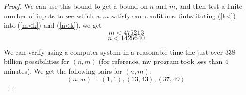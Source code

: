 \documentclass{article}
\begin{document}
\begin{proof}
	We can use this bound to get a bound on $n$ and $m$,
	and then test a finite number of inputs to see which $n,m$ satisfy our conditions.
	Substituting (\ref{k<}) into (\ref{m<k}) and (\ref{n<k}), we get
	\begin{equation}
		m < 475213
	\end{equation}
	\begin{equation}
		n < 1425640
	\end{equation}
	
	We can verify using a computer system in a reasonable time
	the just over $338$ billion possibilities for $(n,m)$
	(for reference, my program took less than $4$ minutes).
	We get the following pairs for $(n,m)$:
	\[
		(n,m) = (1,1), (13,43), (37,49)
	\]
\end{proof}
\end{document}
